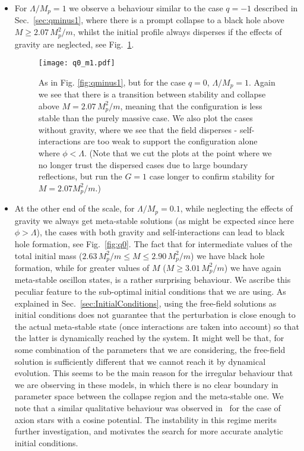 \documentclass[11pt,a4paper]{article}
\begin{document}
\begin{itemize}
\item For $\Lambda/M_p = 1$ we observe a behaviour similar to the case $q=-1$ described in Sec.~\ref{sec:qminus1}, where there is a prompt collapse to a black hole above $M \geq 2.07 \, M_p^2/m$, whilst the initial profile always disperses if the effects of gravity are neglected, see Fig.~\ref{fig:q0Lambda1}.

\begin{figure}[h!]\centering
\texttt{[image: q0\_m1.pdf]}
\caption{As in Fig. \ref{fig:qminus1}, but for the case $q=0$, $\Lambda/M_p=1$. Again we see that there is a transition between stability and collapse above $M = 2.07\, M_p^2/m$, meaning that the configuration is less stable than the purely massive case. We also plot the cases without gravity, where we see that the field disperses - self-interactions are too weak to support the configuration alone where $\phi < \Lambda$. (Note that we cut the plots at the point where we no longer trust the dispersed cases due to large boundary reflections, but run the $G=1$ case longer to confirm stability for $M = 2.07 M_p^2 / m$.)}
\label{fig:q0Lambda1}
\end{figure}

\item At the other end of the scale, for $\Lambda/M_p = 0.1$, while neglecting the effects of gravity we always get meta-stable solutions (as might be expected since here $\phi > \Lambda$), the cases with both gravity and self-interactions can lead to black hole formation, see Fig.~\ref{fig:q0}. 
The fact that for intermediate values of the total initial mass ($2.63 \, M_p^2/m \leq M \leq 2.90 \, M_p^2/m$) we have black hole formation, while for greater values of $M$ ($M \geq 3.01 \, M_p^2/m$) we have again meta-stable oscillon states, is a rather surprising behaviour. We ascribe this peculiar feature to the sub-optimal initial conditions that we are using. As explained in Sec.~\ref{sec:InitialConditions}, using the free-field solutions as initial conditions does not guarantee that the perturbation is close enough to the actual meta-stable state (once interactions are taken into account) so that the latter is dynamically reached by the system. It might well be that, for some combination of the parameters that we are considering, the free-field solution is sufficiently different that we cannot reach it by dynamical evolution. This seems to be the main reason for the irregular behaviour that we are observing in these models, in which there is no clear boundary in parameter space between the collapse region and the meta-stable one. We note that a similar qualitative behaviour was observed in~\cite{1708.01344} for the case of axion stars with a cosine potential. The instability in this regime merits further investigation, and motivates the search for more accurate analytic initial conditions.


\end{itemize}
\end{document}
